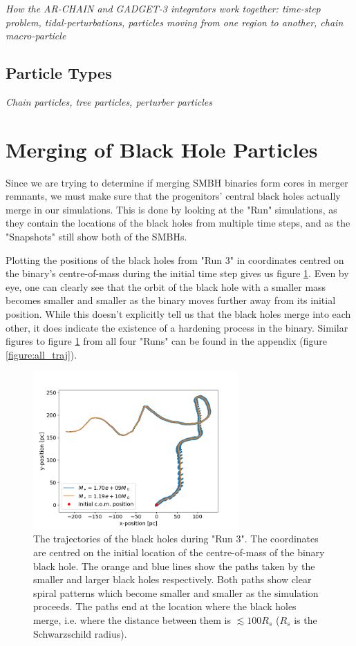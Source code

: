 \documentclass[english, oneside]{HYgradu}
\begin{document}
\textit{How the AR-CHAIN and GADGET-3 integrators work together: time-step problem, tidal-perturbations, particles moving from one region to another, chain macro-particle}

\subsection{Particle Types}

\textit{Chain particles, tree particles, perturber particles}

\section{Merging of Black Hole Particles}

Since we are trying to determine if merging SMBH binaries form cores in merger remnants, we must make sure that the progenitors' central black holes actually merge in our simulations. This is done by looking at the "Run" simulations, as they contain the locations of the black holes from multiple time steps, and as the "Snapshots" still show both of the SMBHs.

Plotting the positions of the black holes from "Run 3" in coordinates centred on the binary's centre-of-mass during the initial time step gives us figure \ref{figure:run3_traj}. Even by eye, one can clearly see that the orbit of the black hole with a smaller mass becomes smaller and smaller as the binary moves further away from its initial position. While this doesn't explicitly tell us that the black holes merge into each other, it does indicate the existence of a hardening process in the binary. Similar figures to figure \ref{figure:run3_traj} from all four "Runs" can be found in the appendix (figure \ref{figure:all_traj}).

\begin{figure}[h]
	\centering	
	\includegraphics[width=0.7\textwidth]{Run3_Trajectory.png}	
	\caption{The trajectories of the black holes during "Run 3". The coordinates are centred on the initial location of the centre-of-mass of the binary black hole. The orange and blue lines show the paths taken by the smaller and larger black holes respectively. Both paths show clear spiral patterns which become smaller and smaller as the simulation proceeds. The paths end at the location where the black holes merge, i.e. where the distance between them is $\lesssim 100 R_s$ ($R_s$ is the Schwarzschild radius).}
	\label{figure:run3_traj}
\end{figure}
\end{document}
